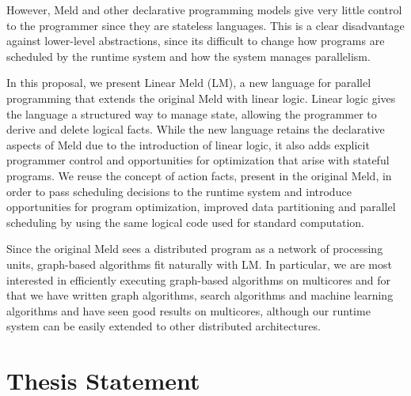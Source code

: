 However, Meld and other declarative programming models give very little control to the programmer since they are stateless languages.
This is a clear disadvantage against lower-level abstractions, since its difficult to change how programs are scheduled by
the runtime system and how the system manages parallelism.

In this proposal, we present Linear Meld (LM), a new language for parallel programming that extends the
original Meld with linear logic. Linear logic gives the language a structured
way to manage state, allowing the programmer to derive and delete logical facts.
While the new language retains the declarative aspects of Meld due to the introduction of linear logic, it also adds explicit programmer control and opportunities for optimization that arise with stateful programs.
We reuse the concept of action facts, present in the original Meld, in order to pass scheduling decisions to
the runtime system and introduce opportunities for program optimization, improved data partitioning and
parallel scheduling by using the same logical code used for standard computation.

Since the original Meld sees a distributed program as a network of processing units, graph-based algorithms fit naturally with LM.
In particular, we are most interested in efficiently executing graph-based algorithms on multicores and for that
we have written graph algorithms, search algorithms and machine learning algorithms and have
seen good results on multicores, although our runtime system can be easily extended to other distributed architectures.

\section{Thesis Statement}



